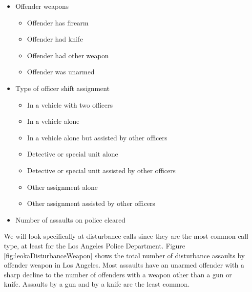 \documentclass[
]{krantz}
\providecommand{\tightlist}{%
  \setlength{\itemsep}{0pt}\setlength{\parskip}{0pt}}
\begin{document}
\begin{itemize}
\tightlist
\item
  Offender weapons

  \begin{itemize}
  \tightlist
  \item
    Offender has firearm
  \item
    Offender had knife
  \item
    Offender had other weapon
  \item
    Offender was unarmed
  \end{itemize}
\item
  Type of officer shift assignment

  \begin{itemize}
  \tightlist
  \item
    In a vehicle with two officers
  \item
    In a vehicle alone
  \item
    In a vehicle alone but assisted by other officers
  \item
    Detective or special unit alone
  \item
    Detective or special unit assisted by other officers
  \item
    Other assignment alone
  \item
    Other assignment assisted by other officers
  \end{itemize}
\item
  Number of assaults on police cleared
\end{itemize}

We will look specifically at disturbance calls since they
are the most common call type, at least for the Los Angeles
Police Department. Figure \ref{fig:leokaDisturbanceWeapon}
shows the total number of disturbance assaults by offender
weapon in Los Angeles. Most assaults have an unarmed
offender with a sharp decline to the number of offenders
with a weapon other than a gun or knife. Assaults by a gun
and by a knife are the least common.
\end{document}

